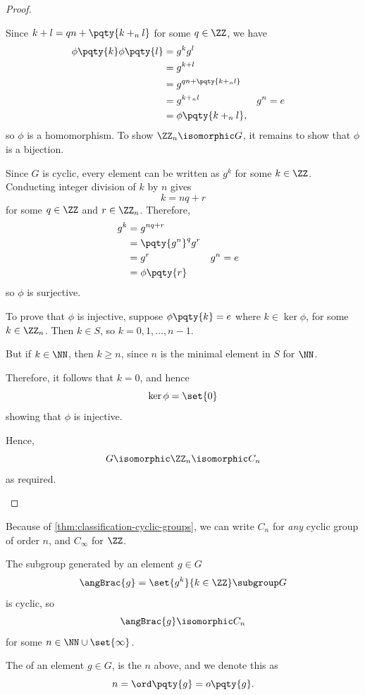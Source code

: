 \begin{proof}
\begin{itemize}
        Since \(k + l = qn + \pqty{k +_n l}\) for some \(q \in \ZZ\), we have
        \begin{align*}
            \phi \pqty{k} \phi \pqty{l} &= g^k g^l \\
            &= g^{k + l} \\
            &= g^{qn + \pqty{k +_n l}} \\
            &= g^{k +_n l} && g^n = e \\
            &= \phi \pqty{k +_n l},
        \end{align*}
        so \(\phi\) is a homomorphism. To show \(\ZZ_n \isomorphic G\), it remains to show that \(\phi\) is a bijection.

        Since \(G\) is cyclic, every element can be written as \(g^k\) for some \(k \in \ZZ\). Conducting integer division of \(k\) by \(n\) gives
        \[
            k = nq + r
        \]
        for some \(q \in \ZZ\) and \(r \in \ZZ_n\). Therefore,
        \begin{align*}
            g^k &= g^{nq + r} \\
            &= \pqty{g^n}^q g^r \\
            &= g^r && g^n = e \\
            &= \phi\pqty{r}
        \end{align*}
        so \(\phi\) is surjective.

        To prove that \(\phi\) is injective, suppose \(\phi\pqty{k} = e\) where \(k \in \ker \phi\), for some \(k \in \ZZ_{n}\). Then \(k \in S\), so \(k = 0, 1, \ldots, n - 1\).

        But if \(k \in \NN\), then \(k \geq n\), since \(n\) is the minimal element in \(S\) for \(\NN\).

        Therefore, it follows that \(k = 0\), and hence
        \[
            \ker \phi = \set{0}
        \]
        showing that \(\phi\) is injective.

        Hence,
        \[
            G \isomorphic \ZZ_n \isomorphic C_n
        \]
        as required.
    \end{itemize}
\end{proof}

Because of \autoref{thm:classification-cyclic-groups}, we can write \(C_n\) for \emph{any} cyclic group of order \(n\), and \(C_\infty\) for \(\ZZ\).

\begin{definition}
    \label{def:order-of-element}%
    The subgroup generated by an element \(g \in G\)
    \[
        \angBrac{g} = \set{g^k}{k \in \ZZ} \subgroup G
    \]
    is cyclic, so
    \[
        \angBrac{g} \isomorphic C_n
    \]
    for some \(n \in \NN \cup \set{\infty}\).

    The  of an element \(g \in G\), is the \(n\) above, and we denote this as
    \[
        n = \ord \pqty{g} = o\pqty{g}.
    \]
\end{definition}

